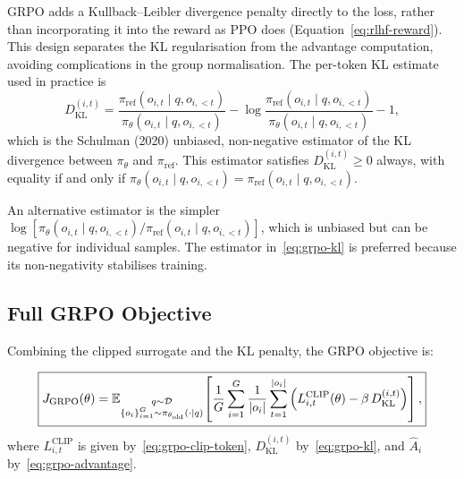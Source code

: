 GRPO adds a Kullback--Leibler divergence penalty directly to the loss, rather than incorporating it into the reward as PPO does (Equation~\eqref{eq:rlhf-reward}).  This design separates the KL regularisation from the advantage computation, avoiding complications in the group normalisation.  The per-token KL estimate used in practice is
\begin{equation}
\label{eq:grpo-kl}
D_{\mathrm{KL}}^{(i,t)} = \frac{\pi_\mathrm{ref}(o_{i,t} \mid q, o_{i,<t})}{\pi_\theta(o_{i,t} \mid q, o_{i,<t})} - \log\frac{\pi_\mathrm{ref}(o_{i,t} \mid q, o_{i,<t})}{\pi_\theta(o_{i,t} \mid q, o_{i,<t})} - 1,
\end{equation}
which is the Schulman (2020) unbiased, non-negative estimator of the KL divergence between $\pi_\theta$ and $\pi_\mathrm{ref}$.  This estimator satisfies $D_{\mathrm{KL}}^{(i,t)} \geq 0$ always, with equality if and only if $\pi_\theta(o_{i,t} \mid q, o_{i,<t}) = \pi_\mathrm{ref}(o_{i,t} \mid q, o_{i,<t})$.

\begin{remark}
An alternative estimator is the simpler $\log[\pi_\theta(o_{i,t} \mid q, o_{i,<t}) / \pi_\mathrm{ref}(o_{i,t} \mid q, o_{i,<t})]$, which is unbiased but can be negative for individual samples.  The estimator in~\eqref{eq:grpo-kl} is preferred because its non-negativity stabilises training.
\end{remark}

\subsection{Full GRPO Objective}

Combining the clipped surrogate and the KL penalty, the GRPO objective is:

\begin{definition}
\label{def:grpo-objective}
\begin{equation}
\label{eq:grpo-objective}
\boxed{
J_{\mathrm{GRPO}}(\theta)
= \operatorname{\mathbb{E}}_{\substack{q \sim \mathcal{D} \\ \{o_i\}_{i=1}^G \sim \pi_{\theta_\mathrm{old}}(\cdot|q)}}
\!\left[
\frac{1}{G}\sum_{i=1}^{G} \frac{1}{|o_i|}\sum_{t=1}^{|o_i|}
\Big(
  L_{i,t}^{\mathrm{CLIP}}(\theta)
  - \beta\, D_{\mathrm{KL}}^{(i,t)}
\Big)
\right],
}
\end{equation}
where $L_{i,t}^{\mathrm{CLIP}}$ is given by~\eqref{eq:grpo-clip-token}, $D_{\mathrm{KL}}^{(i,t)}$ by~\eqref{eq:grpo-kl}, and $\hat{A}_i$ by~\eqref{eq:grpo-advantage}.
\end{definition}

